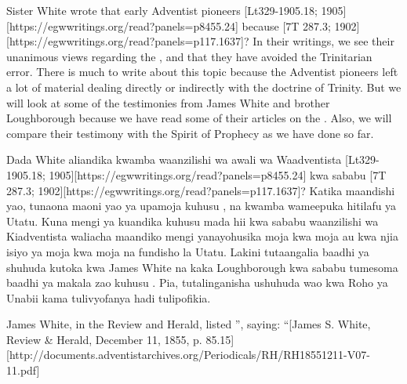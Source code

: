 



Sister White wrote that early Adventist pioneers [Lt329-1905.18; 1905][https://egwwritings.org/read?panels=p8455.24] because [7T 287.3; 1902][https://egwwritings.org/read?panels=p117.1637]? In their writings, we see their unanimous views regarding the , and that they have avoided the Trinitarian error. There is much to write about this topic because the Adventist pioneers left a lot of material dealing directly or indirectly with the doctrine of Trinity. But we will look at some of the testimonies from James White and brother Loughborough because we have read some of their articles on the . Also, we will compare their testimony with the Spirit of Prophecy as we have done so far.


Dada White aliandika kwamba waanzilishi wa awali wa Waadventista [Lt329-1905.18; 1905][https://egwwritings.org/read?panels=p8455.24] kwa sababu [7T 287.3; 1902][https://egwwritings.org/read?panels=p117.1637]? Katika maandishi yao, tunaona maoni yao ya upamoja kuhusu , na kwamba wameepuka hitilafu ya Utatu. Kuna mengi ya kuandika kuhusu mada hii kwa sababu waanzilishi wa Kiadventista waliacha maandiko mengi yanayohusika moja kwa moja au kwa njia isiyo ya moja kwa moja na fundisho la Utatu. Lakini tutaangalia baadhi ya shuhuda kutoka kwa James White na kaka Loughborough kwa sababu tumesoma baadhi ya makala zao kuhusu . Pia, tutalinganisha ushuhuda wao kwa Roho ya Unabii kama tulivyofanya hadi tulipofikia.


James White, in the Review and Herald, listed ”, saying: “[James S. White, Review \& Herald, December 11, 1855, p. 85.15][http://documents.adventistarchives.org/Periodicals/RH/RH18551211-V07-11.pdf]



